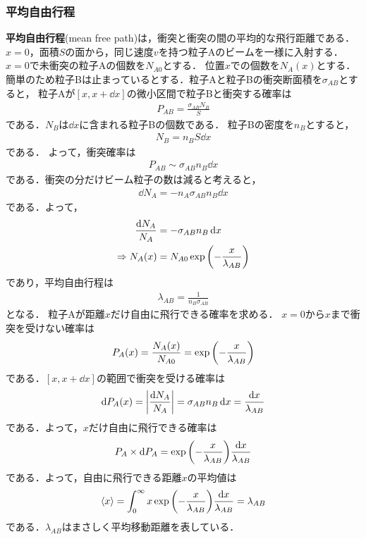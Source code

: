 \documentclass{report}
\begin{document}
      \subsubsection{平均自由行程}
        \textbf{平均自由行程}(mean free path)は，衝突と衝突の間の平均的な飛行距離である．
        $x = 0$，面積$S$の面から，同じ速度$v$を持つ粒子Aのビームを一様に入射する．
        $x = 0$で未衝突の粒子Aの個数を$N_{A0}$とする．
        位置$x$での個数を$N_A(x)$とする．簡単のため粒子Bは止まっているとする．粒子Aと粒子Bの衝突断面積を$\sigma_{AB}$とすると，
        粒子Aが$[x, x + \dd{x}]$の微小区間で粒子Bと衝突する確率は
        \begin{align}
          P_{AB} = \frac{\sigma_{AB}N_B}{S}
        \end{align}
        である．$N_B$は$\dd{x}$に含まれる粒子Bの個数である．
        粒子Bの密度を$n_B$とすると，
        \begin{align}
          N_B = n_B S \dd{x}
        \end{align}
        である．
        よって，衝突確率は
        \begin{align}
          P_{AB} \sim \sigma_{AB} n_B \dd{x}
        \end{align}
        である．衝突の分だけビーム粒子の数は減ると考えると，
        \begin{align}
          \dd{N_A} = -n_A \sigma_{AB} n_B \dd{x}
        \end{align}
        である．よって，
        \begin{align}
          \frac{\dd{N_A}}{N_{A}} &= - \sigma_{AB} n_B \dd{x}\\
          \Rightarrow N_A(x) &= N_{A0} \exp\qty(-\frac{x}{\lambda_{AB}})
        \end{align}
        であり，平均自由行程は
        \begin{align}
          \lambda_{AB} = \frac{1}{n_B \sigma_{AB}}
        \end{align}
        となる．
        粒子Aが距離$x$だけ自由に飛行できる確率を求める．
        $x=0$から$x$まで衝突を受けない確率は
        \begin{align}
          P_A(x) = \frac{N_A(x)}{N_{A0}} = \exp\qty(-\frac{x}{\lambda_{AB}})
        \end{align}
        である．$[x,x+\dd{x}]$の範囲で衝突を受ける確率は
        \begin{align}
          \dd{P_A(x)} = \abs{\frac{\dd{N_A}}{N_A}} = \sigma_{AB} n_B \dd{x} = \frac{\dd{x}}{\lambda_{AB}}
        \end{align}
        である．よって，$x$だけ自由に飛行できる確率は
        \begin{align}
          P_A\times\dd{P_A} = \exp\qty(-\frac{x}{\lambda_{AB}})\frac{\dd{x}}{\lambda_{AB}}
        \end{align}
        である．よって，自由に飛行できる距離$x$の平均値は
        \begin{align}
          \ev{x} = \int_0^{\infty} x\exp\qty(-\frac{x}{\lambda_{AB}})\frac{\dd{x}}{\lambda_{AB}} = \lambda_{AB}
        \end{align}
        である．$\lambda_{AB}$はまさしく平均移動距離を表している．
\end{document}
